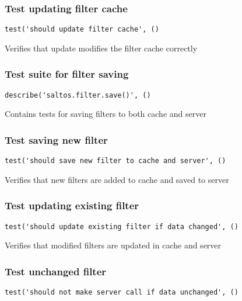 \documentclass[a4paper]{article}
\begin{document}
\hypertarget{toc157}{}
\subsubsection{Test updating filter cache}

\begin{lstlisting}
test('should update filter cache', ()
\end{lstlisting}

Verifies that update modifies the filter cache correctly

\hypertarget{toc158}{}
\subsubsection{Test suite for filter saving}

\begin{lstlisting}
describe('saltos.filter.save()', ()
\end{lstlisting}

Contains tests for saving filters to both cache and server

\hypertarget{toc159}{}
\subsubsection{Test saving new filter}

\begin{lstlisting}
test('should save new filter to cache and server', ()
\end{lstlisting}

Verifies that new filters are added to cache and saved to server

\hypertarget{toc160}{}
\subsubsection{Test updating existing filter}

\begin{lstlisting}
test('should update existing filter if data changed', ()
\end{lstlisting}

Verifies that modified filters are updated in cache and server

\hypertarget{toc161}{}
\subsubsection{Test unchanged filter}

\begin{lstlisting}
test('should not make server call if data unchanged', ()
\end{lstlisting}
\end{document}

